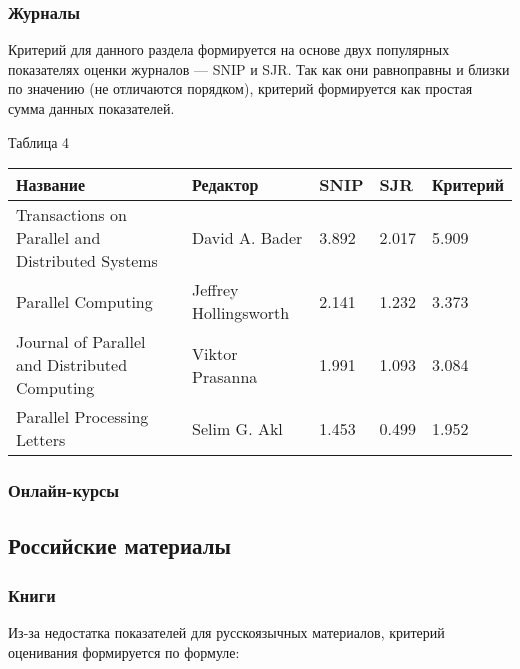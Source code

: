 \documentclass{article}
\begin{document}
		\subsubsection{Журналы}
		Критерий для данного раздела формируется на основе двух популярных показателях оценки журналов — SNIP и SJR. Так как они равноправны и близки по значению (не отличаются порядком), критерий формируется как простая сумма данных показателей.
		\begin{flushleft}
				Таблица 4
				\begin{longtable}{|p{7cm}|p{3cm}|p{1.5cm}|p{1.5cm}|p{2.3cm}|} \hline
				
Название & Редактор & SNIP & SJR & Критерий \\\hline

Transactions on Parallel and Distributed Systems &
David A. Bader  & 3.892 & 2.017 & 5.909\\\hline

Parallel Computing &
Jeffrey Hollingsworth &2.141 & 1.232 & 3.373\\\hline

Journal of Parallel and Distributed Computing &
Viktor Prasanna & 1.991 & 1.093 & 3.084\\\hline

Parallel Processing Letters &
Selim G. Akl & 1.453 & 0.499 & 1.952\\\hline
				\end{longtable}
			\end{flushleft}	
\newpage
		\subsubsection{Онлайн-курсы}
\newpage
	\subsection{Российские материалы}
		\subsubsection{Книги}
		Из-за недостатка показателей для русскоязычных материалов, критерий оценивания формируется по формуле:
			
\end{document}

